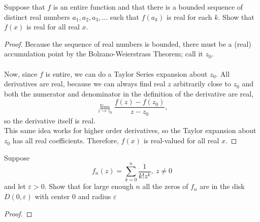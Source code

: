 \documentclass{article}
\newenvironment{problem}[2][Problem]{\begin{trivlist}
\item[\hskip \labelsep {\bfseries #1}\hskip \labelsep {\bfseries #2.}]}{\end{trivlist}}
\begin{document}
\begin{problem}{3}
  Suppose that $f$ is an entire function and that there is a bounded sequence of
  distinct real numbers $a_1, a_2, a_3, \hdots$ such that $f(a_k)$ is real for
  each $k$. Show that $f(x)$ is real for all real $x$.
\end{problem}

\begin{proof}
  Because the sequence of real numbers is bounded, there must be a (real)
  accumulation point by the Bolzano-Weierstrass Theorem; call it $z_0$.
  \\~\\
  Now, since $f$ is entire, we can do a Taylor Series expansion about $z_0$.
  All derivatives are real, because we can always find real $z$ arbitrarily
  close to $z_0$ and both the numerator and denominator in the definition of the
  derivative are real, \[
    \lim_{z \rightarrow z_0} \frac{f(z) - f(z_0)}{z - z_0},
  \] so the derivative itself is real.
  \\
  This same idea works for higher order derivatives, so the Taylor expansion
  about $z_0$ has all real coefficients. Therefore, $f(x)$ is real-valued for
  all real $x$.
\end{proof}

\pagebreak

\begin{problem}{4}
  Suppose \[
    f_n(z) = \sum_{k=0}^n\frac{1}{k!z^k},\ z \neq 0
  \] and let $\varepsilon > 0$. Show that for large enough $n$ all the zeros of
  $f_n$ are in the disk $D(0, \varepsilon)$ with center 0 and radius $\varepsilon$
\end{problem}

\begin{proof}
\end{proof}
\end{document}

